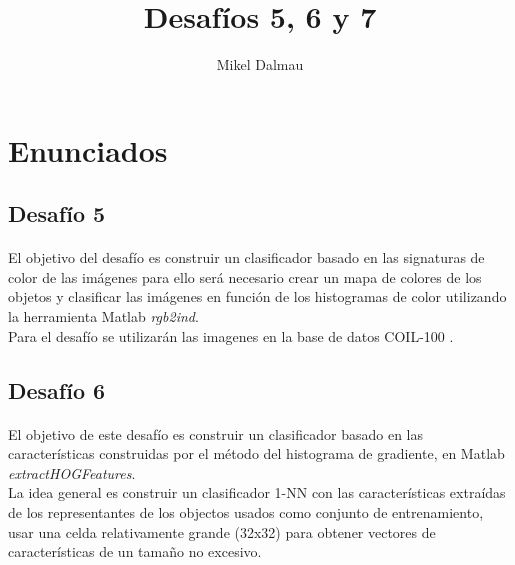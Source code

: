 \documentclass[es,gi]{ifirak}\usepackage[]{graphicx}\usepackage[]{color}
\begin{document}
\title{Desafíos 5, 6 y 7}
\author{Mikel Dalmau}

\maketitle




\tableofcontents

\pagebreak
\section{Enunciados}
\subsection{Desafío 5}
\paragraph{} El objetivo del desafío es construir un clasificador basado en las signaturas de color de las imágenes para ello será necesario crear un mapa de colores de los objetos y clasificar las imágenes en función de los histogramas de color utilizando la herramienta Matlab \textit{rgb2ind}.\\

Para el desafío se utilizarán las imagenes en la base de datos COIL-100 \cite{key-2}.

\subsection{Desafío 6}
\paragraph{}El objetivo de este desafío es construir un clasificador basado en las características construidas por el método del histograma de gradiente, en Matlab \textit{extractHOGFeatures}.\\

La idea general es construir un clasificador 1-NN con las características extraídas de los representantes de los objectos usados como conjunto de entrenamiento, usar una celda relativamente grande (32x32) para obtener vectores de características de un tamaño no excesivo.\\
\end{document}
